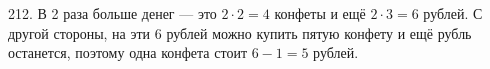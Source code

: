 212. В 2 раза больше денег --- это $2\cdot2=4$ конфеты и ещё $2\cdot3=6$ рублей. С другой стороны, на эти 6 рублей можно купить пятую конфету и ещё рубль останется, поэтому одна конфета стоит $6-1=5$ рублей.\\
